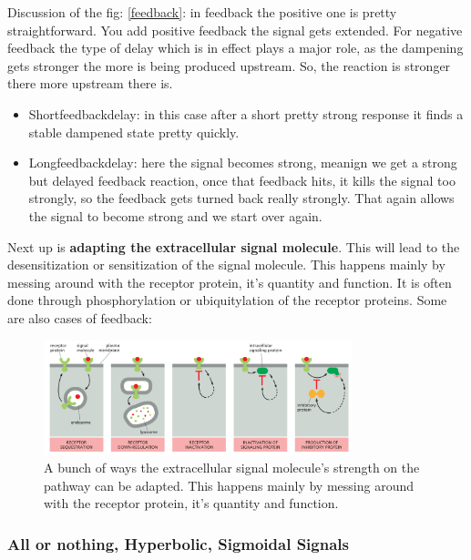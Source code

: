 \documentclass[../main.tex]{subfiles}
\begin{document}
Discussion of the fig: \ref{feedback}: in feedback the positive one is pretty straightforward. You add positive feedback the signal gets extended. For negative feedback the type of delay which is in effect plays a major role, as the dampening gets stronger the more is being produced upstream. So, the reaction is stronger there more upstream there is.
\begin{itemize}
	\item \gls{Shortfeedbackdelay}: in this case after a short pretty strong response it finds a stable dampened state pretty quickly.
	\item \gls{Longfeedbackdelay}: here the signal becomes strong, meanign we get a strong but delayed feedback reaction, once that feedback hits, it kills the signal too strongly, so the feedback gets turned back really strongly. That again allows the signal to become strong and we start over again. \\
\end{itemize}

Next up is \textbf{adapting the extracellular signal molecule}. This will lead to the desensitization or sensitization of the signal molecule. This happens mainly by messing around with the receptor protein, it's quantity and function. It is often done through phosphorylation or ubiquitylation of the receptor proteins. Some are also cases of feedback:

\begin{figure}[H]
	\centering
	\includegraphics[width=0.8\textwidth]{reg_ext}
	\caption{A bunch of ways the extracellular signal molecule's strength on the pathway can be adapted. This happens mainly by messing around with the receptor protein, it's quantity and function.}
\end{figure}

\subsubsection{All or nothing, Hyperbolic, Sigmoidal Signals}
\end{document}
